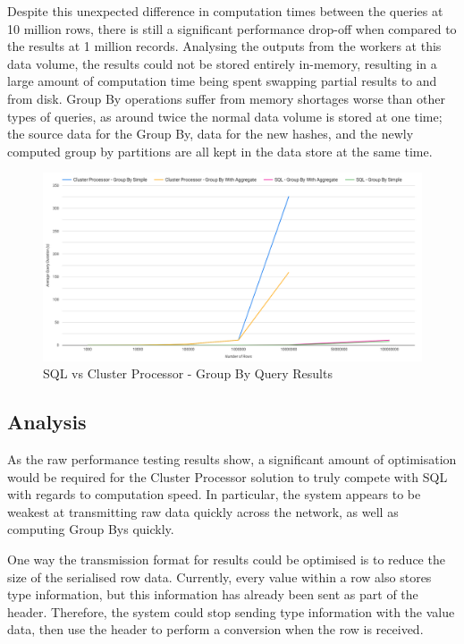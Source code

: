 Despite this unexpected difference in computation times between the queries at 10 million rows, there is still a significant performance drop-off when compared to the results at 1 million records. Analysing the outputs from the workers at this data volume, the results could not be stored entirely in-memory, resulting in a large amount of computation time being spent swapping partial results to and from disk. Group By operations suffer from memory shortages worse than other types of queries, as around twice the normal data volume is stored at one time; the source data for the Group By, data for the new hashes, and the newly computed group by partitions are all kept in the data store at the same time.

\begin{figure}[htp]
	\centering
	\includegraphics[width=0.8\linewidth]{chapters/diagrams/testing/group-by-1k-100m}
	\caption{SQL vs Cluster Processor - Group By Query Results}
	\label{fig:group-by-graph}
\end{figure}

\subsection{Analysis}
As the raw performance testing results show, a significant amount of optimisation would be required for the Cluster Processor solution to truly compete with SQL with regards to computation speed. In particular, the system appears to be weakest at transmitting raw data quickly across the network, as well as computing Group Bys quickly.

One way the transmission format for results could be optimised is to reduce the size of the serialised row data. Currently, every value within a row also stores type information, but this information has already been sent as part of the header. Therefore, the system could stop sending type information with the value data, then use the header to perform a conversion when the row is received. 

